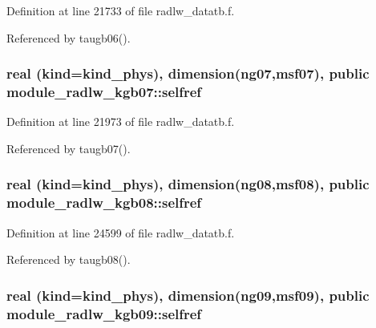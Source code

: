 Definition at line 21733 of file radlw\+\_\+datatb.\+f.



Referenced by taugb06().

\subsubsection[{\texorpdfstring{selfref}{selfref}}]{\setlength{\rightskip}{0pt plus 5cm}real (kind=kind\+\_\+phys), dimension(ng07,msf07), public module\+\_\+radlw\+\_\+kgb07\+::selfref}\hypertarget{group__module__radlw__main_gaaf6d41f390a0465af92756b9c3e6c558}{}\label{group__module__radlw__main_gaaf6d41f390a0465af92756b9c3e6c558}


Definition at line 21973 of file radlw\+\_\+datatb.\+f.



Referenced by taugb07().

\subsubsection[{\texorpdfstring{selfref}{selfref}}]{\setlength{\rightskip}{0pt plus 5cm}real (kind=kind\+\_\+phys), dimension(ng08,msf08), public module\+\_\+radlw\+\_\+kgb08\+::selfref}\hypertarget{group__module__radlw__main_ga2c38561d26f86f7ae515b433843c4e5d}{}\label{group__module__radlw__main_ga2c38561d26f86f7ae515b433843c4e5d}


Definition at line 24599 of file radlw\+\_\+datatb.\+f.



Referenced by taugb08().

\subsubsection[{\texorpdfstring{selfref}{selfref}}]{\setlength{\rightskip}{0pt plus 5cm}real (kind=kind\+\_\+phys), dimension(ng09,msf09), public module\+\_\+radlw\+\_\+kgb09\+::selfref}\hypertarget{group__module__radlw__main_ga1c65e91a215060738292d0ca5a8f38a2}{}\label{group__module__radlw__main_ga1c65e91a215060738292d0ca5a8f38a2}


